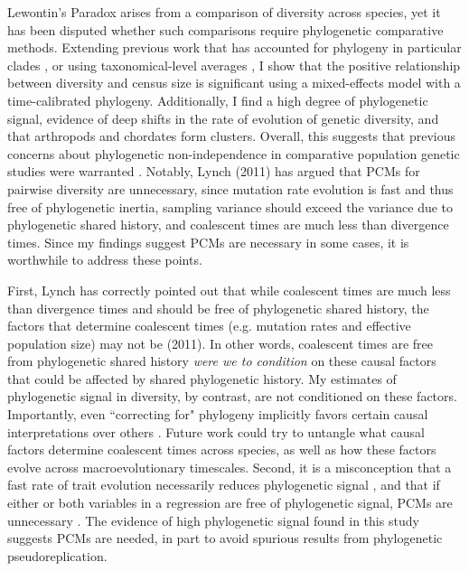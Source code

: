 \documentclass[9pt,lineno]{elife}
\begin{document}

Lewontin's Paradox arises from a comparison of diversity across species, yet it
has been disputed whether such comparisons require phylogenetic comparative
methods. Extending previous work that has accounted for phylogeny in particular
clades \citep{Leffler2012-zj}, or using taxonomical-level averages
\citep{Romiguier2014-bp}, I show that the positive relationship between
diversity and census size is significant using a mixed-effects model with a
time-calibrated phylogeny. Additionally, I find a high degree of phylogenetic
signal, evidence of deep shifts in the rate of evolution of genetic diversity,
and that arthropods and chordates form clusters. Overall, this suggests that
previous concerns about phylogenetic non-independence in comparative population
genetic studies were warranted \citep{Gillespie1991-qa,Whitney2010-ud}.
Notably, Lynch (2011) has argued that PCMs for pairwise diversity are
unnecessary, since mutation rate evolution is fast and thus free of
phylogenetic inertia, sampling variance should exceed the variance due to
phylogenetic shared history, and coalescent times are much less than divergence
times. Since my findings suggest PCMs are necessary in some cases, it is
worthwhile to address these points. 

First, Lynch has correctly pointed out that while coalescent times are much
less than divergence times and should be free of phylogenetic shared history,
the factors that determine coalescent times (e.g.  mutation rates and effective
population size) may not be (2011). In other words, coalescent times are free
from phylogenetic shared history \emph{were we to condition} on these causal
factors that could be affected by shared phylogenetic history. My estimates of
phylogenetic signal in diversity, by contrast, are not conditioned on these
factors. Importantly, even ``correcting for" phylogeny implicitly favors
certain causal interpretations over others
\citep{Westoby1995-wz,Uyeda2018-wf}. Future work could try to untangle what
causal factors determine coalescent times across species, as well as how these
factors evolve across macroevolutionary timescales. Second, it is a
misconception that a fast rate of trait evolution necessarily reduces
phylogenetic signal \citep{Revell2008-in}, and that if either or both
variables in a regression are free of phylogenetic signal, PCMs are unnecessary
\citep{Revell2010-mf,Uyeda2018-wf}. The evidence of high phylogenetic
signal found in this study suggests PCMs are needed, in part to avoid spurious
results from phylogenetic pseudoreplication.
\end{document}
